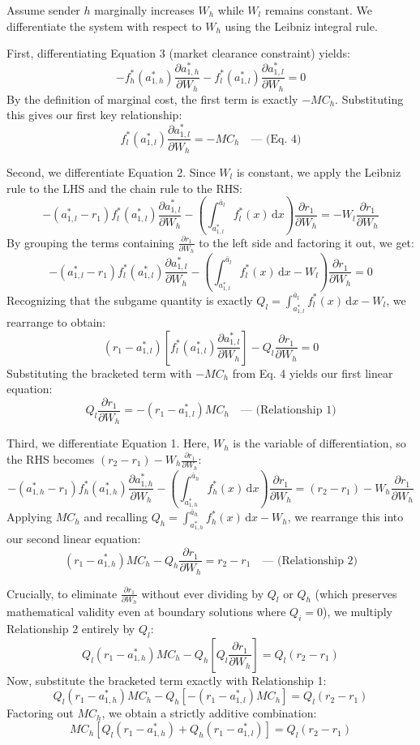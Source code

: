 \documentclass[12pt, a4paper]{article}
\begin{document}
Assume sender $h$ marginally increases $W_h$ while $W_l$ remains constant. We differentiate the system with respect to $W_h$ using the Leibniz integral rule.

First, differentiating Equation 3 (market clearance constraint) yields:
$$-f_h^*(a_{1,h}^*) \frac{\partial a_{1,h}^*}{\partial W_h} - f_l^*(a_{1,l}^*) \frac{\partial a_{1,l}^*}{\partial W_h} = 0$$
By the definition of marginal cost, the first term is exactly $-MC_h$. Substituting this gives our first key relationship:
$$f_l^*(a_{1,l}^*) \frac{\partial a_{1,l}^*}{\partial W_h} = -MC_h \quad \text{--- (Eq. 4)}$$

Second, we differentiate Equation 2. Since $W_l$ is constant, we apply the Leibniz rule to the LHS and the chain rule to the RHS:
$$-(a_{1,l}^* - r_1) f_l^*(a_{1,l}^*) \frac{\partial a_{1,l}^*}{\partial W_h} - \left( \int_{a_{1,l}^*}^{\bar{a}_l} f_l^*(x) \, \mathrm{d}x \right) \frac{\partial r_1}{\partial W_h} = -W_l \frac{\partial r_1}{\partial W_h}$$
By grouping the terms containing $\frac{\partial r_1}{\partial W_h}$ to the left side and factoring it out, we get:
$$-(a_{1,l}^* - r_1) f_l^*(a_{1,l}^*) \frac{\partial a_{1,l}^*}{\partial W_h} - \left( \int_{a_{1,l}^*}^{\bar{a}_l} f_l^*(x) \, \mathrm{d}x - W_l \right) \frac{\partial r_1}{\partial W_h} = 0$$
Recognizing that the subgame quantity is exactly $Q_l = \int_{a_{1,l}^*}^{\bar{a}_l} f_l^*(x) \, \mathrm{d}x - W_l$, we rearrange to obtain:
$$(r_1 - a_{1,l}^*) \left[ f_l^*(a_{1,l}^*) \frac{\partial a_{1,l}^*}{\partial W_h} \right] - Q_l \frac{\partial r_1}{\partial W_h} = 0$$
Substituting the bracketed term with $-MC_h$ from Eq. 4 yields our first linear equation:
$$Q_l \frac{\partial r_1}{\partial W_h} = -(r_1 - a_{1,l}^*) MC_h \quad \text{--- (Relationship 1)}$$

Third, we differentiate Equation 1. Here, $W_h$ is the variable of differentiation, so the RHS becomes $(r_2 - r_1) - W_h \frac{\partial r_1}{\partial W_h}$:
$$-(a_{1,h}^* - r_1) f_h^*(a_{1,h}^*) \frac{\partial a_{1,h}^*}{\partial W_h} - \left( \int_{a_{1,h}^*}^{\bar{a}_h} f_h^*(x) \, \mathrm{d}x \right) \frac{\partial r_1}{\partial W_h} = (r_2 - r_1) - W_h \frac{\partial r_1}{\partial W_h}$$
Applying $MC_h$ and recalling $Q_h = \int_{a_{1,h}^*}^{\bar{a}_h} f_h^*(x) \, \mathrm{d}x - W_h$, we rearrange this into our second linear equation:
$$(r_1 - a_{1,h}^*) MC_h - Q_h \frac{\partial r_1}{\partial W_h} = r_2 - r_1 \quad \text{--- (Relationship 2)}$$

Crucially, to eliminate $\frac{\partial r_1}{\partial W_h}$ without ever dividing by $Q_l$ or $Q_h$ (which preserves mathematical validity even at boundary solutions where $Q_i = 0$), we multiply Relationship 2 entirely by $Q_l$:
$$Q_l (r_1 - a_{1,h}^*) MC_h - Q_h \left[ Q_l \frac{\partial r_1}{\partial W_h} \right] = Q_l (r_2 - r_1)$$
Now, substitute the bracketed term exactly with Relationship 1:
$$Q_l (r_1 - a_{1,h}^*) MC_h - Q_h \left[ -(r_1 - a_{1,l}^*) MC_h \right] = Q_l (r_2 - r_1)$$
Factoring out $MC_h$, we obtain a strictly additive combination:
$$MC_h \left[ Q_l(r_1 - a_{1,h}^*) + Q_h(r_1 - a_{1,l}^*) \right] = Q_l (r_2 - r_1)$$
\end{document}
